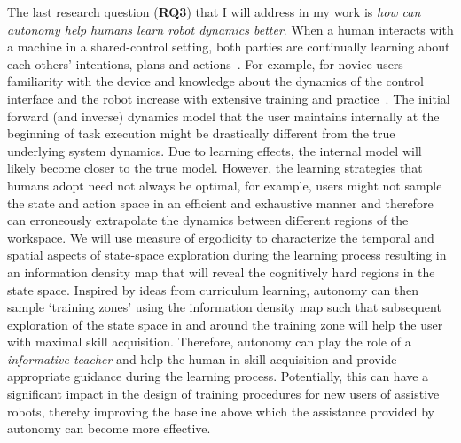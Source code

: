 \documentclass[12pt]{article}
\begin{document}
The last research question (\textbf{RQ3}) that I will address in my work is \textit{how can autonomy help humans learn robot dynamics better}. When a human interacts with a machine in a shared-control setting, both parties are continually learning about each others' intentions, plans and actions~\cite{ikemoto2012physical}. For example, for novice users familiarity with the device and knowledge about the dynamics of the control interface and the robot increase with extensive training and practice~\cite{mussaivaldi2000motor}. The initial forward (and inverse) dynamics model that the user maintains internally at the beginning of task execution might be drastically different from the true underlying system dynamics. Due to learning effects, the internal model will likely become closer to the true model. However, the learning strategies that humans adopt need not always be optimal, for example, users might not sample the state and action space in an efficient and exhaustive manner and therefore can erroneously extrapolate the dynamics between different regions of the workspace. We will use measure of ergodicity to characterize the temporal and spatial aspects of state-space exploration during the learning process resulting in an information density map that will reveal the cognitively hard regions in the state space. Inspired by ideas from curriculum learning, autonomy can then sample `training zones' using the information density map such that subsequent exploration of the state space in and around the training zone will help the user with maximal skill acquisition. Therefore, autonomy can play the role of a \textit{informative teacher} and help the human in skill acquisition and provide appropriate guidance during the learning process. Potentially, this can have a significant impact in the design of training procedures for new users of assistive robots, thereby improving the baseline above which the assistance provided by autonomy can become more effective. 
\end{document}
